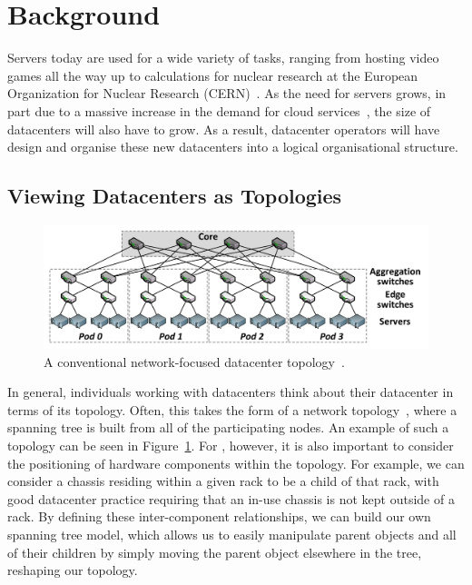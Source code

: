 \documentclass[11pt]{article}
\begin{document}
\section{Background} \label{sec:background}
	Servers today are used for a wide variety of tasks, ranging from hosting video games all the way up to calculations for nuclear research at the European Organization for Nuclear Research (CERN)~\cite{Andrade2012}.
	As the need for servers grows, in part due to a massive increase in the demand for cloud services~\cite{Pring2009}, the size of datacenters will also have to grow.
	As a result, datacenter operators will have design and organise these new datacenters into a logical organisational structure.
	\subsection{Viewing Datacenters as Topologies}
		\begin{figure}[]
			\centering
			\includegraphics[width=\textwidth]{couto2012/Fat-tree-with-4-port-switches-n-4.png}
			\caption[A conventional network-focused datacenter topology]{A conventional network-focused datacenter topology~\cite{Couto2012}.}
			\label{fig:networktopology}
		\end{figure}
		In general, individuals working with datacenters think about their datacenter in terms of its topology. 
		Often, this takes the form of a network topology~\cite{Couto2012}, where a spanning tree is built from all of the participating nodes.
		An example of such a topology can be seen in Figure~\ref{fig:networktopology}. 
		For \opendc{}, however, it is also important to consider the positioning of hardware components within the topology.
		For example, we can consider a chassis residing within a given rack to be a child of that rack, with good datacenter practice requiring that an in-use chassis is not kept outside of a rack.
		By defining these inter-component relationships, we can build our own spanning tree model, which allows us to easily manipulate parent objects and all of their children by simply moving the parent object elsewhere in the tree, reshaping our topology.
\end{document}
